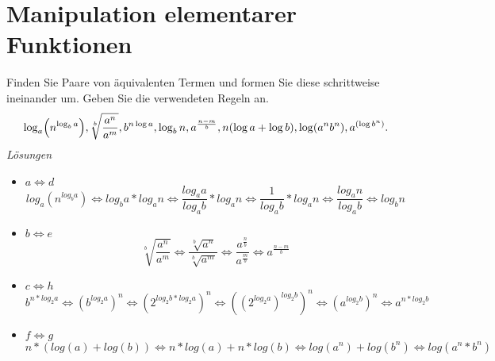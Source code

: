 \newpage



\newpage
\section{Manipulation elementarer Funktionen}

Finden Sie Paare von \"aquivalenten Termen und formen Sie diese
schrittweise ineinander um. Geben Sie die verwendeten Regeln an.
\[
 \log_a\Bigl(n^{\log_b a}\Bigr), \sqrt[b]{\frac{a^n}{a^m}},
 b^{n \log a}, \log_b n, a^{\frac{n-m}{b}}, n(\log a + \log b),
 \log(a^nb^n),a^{(\log b^n)}.
\]
{\itshape Lösungen}
\begin{itemize}
\item $a \Leftrightarrow d$ \\
	  \[
      log_{a}(n^{log_{b}a}) \Leftrightarrow log_{b}a * log_{a}n \Leftrightarrow \frac{log_{a}a}{log_{a}b} * log_{a}n \Leftrightarrow \frac{1}{log_{a}b} * log_{a}n \Leftrightarrow \frac{log_{a}n}{log_{a}b} \Leftrightarrow log_{b}n
      \]
\item $b \Leftrightarrow e$ \\
	  \[
       \sqrt[b]{\frac{a^n}{a^m}} \Leftrightarrow \frac{\sqrt[b]{a^n}}{\sqrt[b]{a^m}} \Leftrightarrow \frac{a^{\frac{n}{b}}}{a^{\frac{m}{b}}} \Leftrightarrow a^{\frac{n-m}{b}}
      \]
\item $c \Leftrightarrow h$ \\
	  \[
        b^{n*log_{2}a} \Leftrightarrow (b^{log_{2}a})^n \Leftrightarrow (2^{log_{2}b * log_{2}a})^n \Leftrightarrow ((2^{log_{2}a})^{log_{2}b})^n \Leftrightarrow (a^{log_{2}b})^n \Leftrightarrow a^{n * log_{2}b}
      \]
\item $ f \Leftrightarrow g$
      \[
       n*(log(a) + log(b)) \Leftrightarrow n * log(a) + n* log(b) \Leftrightarrow log(a^n) + log(b^n) \Leftrightarrow log(a^n*b^n)
      \]
\end{itemize}




